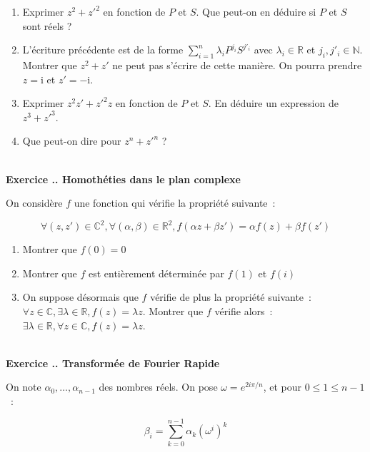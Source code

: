 \documentclass{article}
\newcommand{\mb}[1]{\mathbb{#1}}
\newcounter{exo}
\newcommand{\exercice}[1][\null]{\textbf{\\ Exercice \thesection.\theexo. #1} \addtocounter{exo}{1}}
\begin{document}
\begin{enumerate}

\item Exprimer $z^2 + z'^2$ en fonction de $P$ et $S$. Que peut-on en déduire si $P$ et $S$ sont réels ?

\item L'écriture précédente est de la forme $\sum_{i=1}^n \lambda_i P^{j_i} S^{j'_i}$ avec $\lambda_i \in \mb{R}$ et $j_i, j'_i \in \mb{N}$. Montrer que $z^2 + z'$ ne peut pas s'écrire de cette manière. On pourra prendre $z = \text{i}$ et $z' = - \text{i}$.

\item Exprimer $z^2 z' + z'^2z $ en fonction de $P$ et $S$. En déduire un expression de $z^3 + z'^3$.

\item Que peut-on dire pour $z^n + z'^n$ ?

\end{enumerate}


\exercice[Homothéties dans le plan complexe]

On considère $f$ une fonction qui vérifie la propriété 
suivante~:

\begin{equation*}
    \forall (z,z') \in \mathbb{C}^2,
    \forall (\alpha, \beta) \in \mathbb{R}^2,
    f( \alpha z + \beta z') = \alpha f (z) + \beta f(z')
\end{equation*}

\begin{enumerate}
    \item Montrer que $f(0) = 0$
    \item Montrer que $f$ est entièrement déterminée 
        par $f(1)$ et $f(i)$

    \item On suppose désormais que $f$ vérifie de plus 
        la propriété suivante~: $\forall z \in \mathbb{C},
        \exists \lambda \in \mathbb{R}, f (z) = \lambda z$.
        Montrer que $f$ vérifie alors~: $\exists \lambda
        \in \mathbb{R}, \forall z \in \mathbb{C}, f(z) = \lambda z$.
\end{enumerate}


\exercice[Transformée de Fourier Rapide]

On note $\alpha_0, \dots, \alpha_{n-1}$ des nombres réels.
On pose $\omega = e^{2i\pi / n}$, et 
pour $0 \leq 1 \leq n - 1$~:

\begin{equation*}
    \beta_i = \sum_{k = 0}^{n-1} \alpha_k (\omega^i)^k
\end{equation*}
\end{document}
